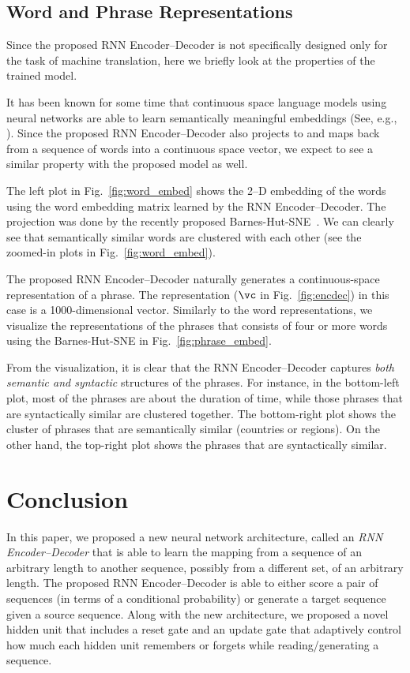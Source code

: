\subsection{Word and Phrase Representations}
\label{sec:rep}

Since the proposed RNN Encoder--Decoder is not specifically designed only for
the task of machine translation, here we briefly look at the properties of the
trained model. 

It has been known for some time that continuous space language models using
neural networks are able to learn semantically meaningful embeddings (See, e.g.,
\mbox{\cite{Bengio2003lm,Mikolov2013}}).  Since the proposed RNN Encoder--Decoder also
projects to and maps back from a sequence of words into a continuous space
vector, we expect to see a similar property with the proposed model as well.

The left plot in Fig.~\mbox{\ref{fig:word_embed}} shows the 2--D embedding of the
words using the word embedding matrix learned by the RNN Encoder--Decoder. The
projection was done by the recently proposed Barnes-Hut-SNE~\mbox{\cite{Maaten2013}}.
We can clearly see that semantically similar words are clustered with each other
(see the zoomed-in plots in Fig.~\mbox{\ref{fig:word_embed}}). 

The proposed RNN Encoder--Decoder naturally generates a continuous-space
representation of a phrase. The representation ($\vc$ in Fig.~\mbox{\ref{fig:encdec}})
in this case is a 1000-dimensional vector. Similarly to the word
representations, we visualize the representations of the phrases that consists of
four or more words using the Barnes-Hut-SNE in Fig.~\mbox{\ref{fig:phrase_embed}}.

From the visualization, it is clear that the RNN Encoder--Decoder captures
\textit{both semantic and syntactic} structures of the phrases. For instance,
in the bottom-left plot, most of the phrases are about the duration of time,
while those phrases that are syntactically similar are clustered together. 
The bottom-right plot shows the cluster of phrases that are semantically similar
(countries or regions). On the other hand, the top-right plot shows the phrases
that are syntactically similar.


\section{Conclusion}

In this paper, we proposed a new neural network architecture, called an
\textit{RNN Encoder--Decoder} that is able to learn the mapping from a sequence
of an arbitrary length to another sequence, possibly from a different set, of an
arbitrary length. The proposed RNN Encoder--Decoder is able to either score a
pair of sequences (in terms of a conditional probability) or generate a target
sequence given a source sequence.
Along with the new architecture, we proposed a novel hidden unit that includes a
reset gate and an update gate that adaptively control how much each hidden unit
remembers or forgets while reading/generating a sequence. 

